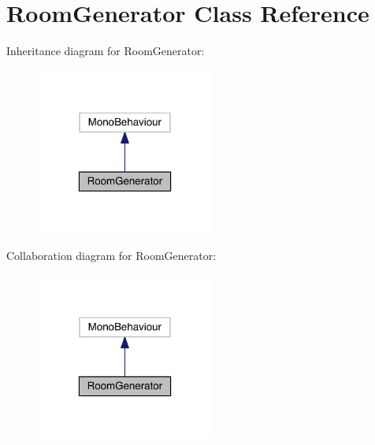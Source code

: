 \hypertarget{class_room_generator}{}\section{Room\+Generator Class Reference}
\label{class_room_generator}


Inheritance diagram for Room\+Generator\+:\nopagebreak
\begin{figure}[H]
\begin{center}
\leavevmode
\includegraphics[width=166pt]{class_room_generator__inherit__graph}
\end{center}
\end{figure}


Collaboration diagram for Room\+Generator\+:\nopagebreak
\begin{figure}[H]
\begin{center}
\leavevmode
\includegraphics[width=166pt]{class_room_generator__coll__graph}
\end{center}
\end{figure}
